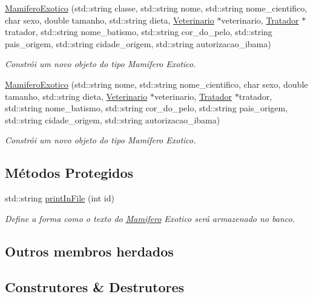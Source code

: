 \begin{DoxyCompactItemize}
\hyperlink{classMamiferoExotico_a8a37f494ace0c42dfd8fabe5c1f93261}{Mamifero\+Exotico} (std\+::string classe, std\+::string nome, std\+::string nome\+\_\+cientifico, char sexo, double tamanho, std\+::string dieta, \hyperlink{classVeterinario}{Veterinario} $\ast$veterinario, \hyperlink{classTratador}{Tratador} $\ast$tratador, std\+::string nome\+\_\+batismo, std\+::string cor\+\_\+do\+\_\+pelo, std\+::string pais\+\_\+origem, std\+::string cidade\+\_\+origem, std\+::string autorizacao\+\_\+ibama)
\begin{DoxyCompactList}\small\item\em Constrói um novo objeto do tipo Mamífero Exotico. \end{DoxyCompactList}\item 
\hyperlink{classMamiferoExotico_a02bae9875424a81c397082e378eb2168}{Mamifero\+Exotico} (std\+::string nome, std\+::string nome\+\_\+cientifico, char sexo, double tamanho, std\+::string dieta, \hyperlink{classVeterinario}{Veterinario} $\ast$veterinario, \hyperlink{classTratador}{Tratador} $\ast$tratador, std\+::string nome\+\_\+batismo, std\+::string cor\+\_\+do\+\_\+pelo, std\+::string pais\+\_\+origem, std\+::string cidade\+\_\+origem, std\+::string autorizacao\+\_\+ibama)
\begin{DoxyCompactList}\small\item\em Constrói um novo objeto do tipo Mamífero Exotico. \end{DoxyCompactList}\end{DoxyCompactItemize}
\subsection*{Métodos Protegidos}
\begin{DoxyCompactItemize}
\item 
std\+::string \hyperlink{classMamiferoExotico_a4ee6f5f4a2917cfdf54304525add0c4a}{print\+In\+File} (int id)
\begin{DoxyCompactList}\small\item\em Define a forma como o texto do \hyperlink{classMamifero}{Mamifero} Exotico será armazenado no banco. \end{DoxyCompactList}\end{DoxyCompactItemize}
\subsection*{Outros membros herdados}


\subsection{Construtores \& Destrutores}
\mbox{\label{classMamiferoExotico_a79b2b19d1c2de729de2b92c173521379}} 
